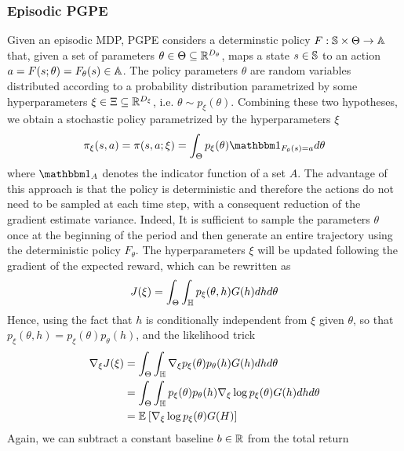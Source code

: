 \subsubsection{Episodic PGPE}
Given an episodic MDP, PGPE considers a determinstic policy $F: \S \times
\Theta \to \A$ that, given a set of parameters $\theta \in \Theta \subseteq
\R^{D_\theta}$, maps a state $s \in \S$ to an action $a = F(s; \theta) =
F_\theta(s) \in \A$. The policy parameters $\theta$ are random variables 
distributed according to a probability distribution parametrized by some 
hyperparameters $\xi \in \Xi \subseteq \R^{D_\xi}$, i.e.  $\theta \sim 
p_\xi(\theta)$. Combining these two hypotheses, we obtain a stochastic policy
parametrized by the hyperparameters $\xi$ 
\begin{equation}
	\pi_\xi(s, a) = \pi(s, a; \xi) = \int_\Theta p_\xi(\theta)
	\ind{F_\theta(s) = a} d\theta
\end{equation}
where $\ind{A}$ denotes the indicator function of a set $A$. The advantage of
this approach is that the policy is deterministic and therefore the actions do
not need to be sampled at each time step, with a consequent reduction of the
gradient estimate variance. Indeed, It is sufficient to sample the parameters 
$\theta$ once at the beginning of the period and then generate an entire 
trajectory using the deterministic policy $F_\theta$. The hyperparameters $\xi$ 
will be updated following the gradient of the expected reward, which can be 
rewritten as 
\begin{equation}
	\begin{split}
		J(\xi) &= \int_\Theta \int_\H p_\xi(\theta, h) G(h) dh d\theta\\
	\end{split}
\end{equation}
Hence, using the fact that $h$ is conditionally independent from $\xi$ given
$\theta$, so that $p_\xi(\theta, h) = p_\xi(\theta) p_\theta(h)$, and the 
likelihood trick 
\begin{equation}
	\begin{split}
		\nabla_\xi J(\xi) &= \int_\Theta \int_\H \nabla_\xi p_\xi(\theta) 
						     p_\theta(h) G(h) dh d\theta\\
						  &= \int_\Theta \int_\H p_\xi(\theta) p_\theta(h) 
							 \nabla_\xi \log p_\xi(\theta) G(h) dh d\theta\\
						  &= \E{\nabla_\xi \log p_\xi(\theta) G(H)}
	\end{split}
\end{equation}
Again, we can subtract a constant baseline $b \in \R$ from the total return 
